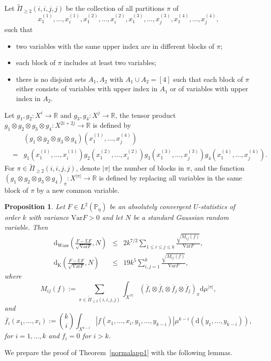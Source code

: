 \documentclass{article}
\newtheorem{prop}[theorem]{Proposition}
\theoremstyle{definition}
\numberwithin{equation}{section}
\theoremstyle{remark}
\newcommand{\E}{\mathbb{E}}
\newcommand{\R}{\mathbb{R}}
\newcommand{\Var}{\mathrm{Var}}
\begin{document}
Let $\widetilde{\Pi}_{\ge2}(i,i,j,j)$ be the collection of all partitions $\pi$ of 
$$x_1^{(1)},\dots,x_i^{(1)},x_1^{(2)},\dots,x_i^{(2)},x_1^{(3)},\dots,x_j^{(3)},x_1^{(4)},\dots,x_j^{(4)},$$
such that 
\begin{itemize}
\item two variables with the same upper index are in different blocks of $\pi$;
\item each block of $\pi$ includes at least two variables;
\item there is no disjoint sets $A_1,A_2$ with $A_1\cup A_2=[4]$ such that each block of $\pi$ either consists of variables with upper index in $A_1$ or of variables with upper index in $A_2$.
\end{itemize}
Let $g_1,g_2:X^i\to\R$ and $g_3,g_4:X^j\to\R$, the tensor product $g_1\otimes g_2\otimes g_3\otimes g_4:X^{2i+2j}\to\R$ is defined by 
\begin{eqnarray*}
&&(g_1\otimes g_2\otimes g_3\otimes g_4)(x_1^{(1)},\dots,x_j^{(4)})\\
&=&g_1(x_1^{(1)},\dots,x_{i}^{(1)})g_2(x_1^{(2)},\dots,x_{i}^{(2)})g_3(x_1^{(3)},\dots,x_{j}^{(3)})g_4(x_1^{(4)},\dots,x_{j}^{(4)}).
\end{eqnarray*}
For $\pi\in\widetilde{\Pi}_{\ge2}(i,i,j,j)$, denote $|\pi|$ the number of blocks in $\pi$, and the function $(g_1\otimes g_2\otimes g_3\otimes g_4)_\pi:X^{|\pi|}\to\R$ is defined by replacing all variables in the same block of $\pi$ by a new common variable.
\begin{prop}\label{normalU-1}
Let $F\in L^2(\mathbb{P}_\eta)$ be an absolutely convergent $U$-statistics of order $k$ with variance $\Var F>0$ and let $N$ be a standard Gaussian random variable. Then 
\begin{eqnarray}
	\mathrm{d}_{\mathrm{Wass}}\left(\frac{F-\E F}{\sqrt{\Var F}},N\right)&\le&2k^{7/2}\sum_{1\le i\le j\le k}\frac{\sqrt{M_{ij}(f)}}{\Var F},\\
	\mathrm{d}_{\mathrm{K}}\left(\frac{F-\E F}{\sqrt{\Var F}},N\right)&\le&19k^5\sum_{i,j=1}^k\frac{\sqrt{M_{ij}(f)}}{\Var F} ,
\end{eqnarray}
where 
\begin{equation}
    M_{ij}(f):=\sum_{\pi\in\widetilde{\Pi}_{\ge2}(i,i,j,j)}\int_{X^{|\pi|}}(\overline{f}_i\otimes\overline{f}_i\otimes\overline{f}_j\otimes\overline{f}_j)_{\pi}\mathrm{d}\mu^{|\pi|},
\end{equation}
and 
\begin{equation}
    \overline{f}_i(x_1,\dots,x_i):={k\choose i}\int_{X^{k-i}}|f(x_1,\dots,x_i,y_1,\dots,y_{k-i})|\mu^{k-i}(\mathrm{d}(y_1,\dots,y_{k-i})),
\end{equation}
for $i=1,\dots,k$ and $f_i=0$ for $i>k$.
\end{prop}
We prepare the proof of Theorem~\ref{normalapp1} with the following lemmas.
\end{document}
